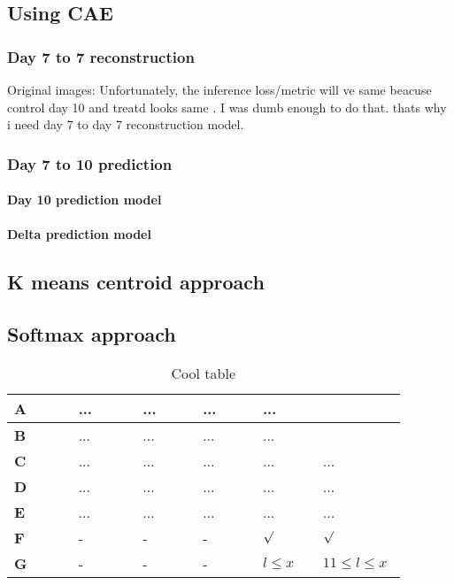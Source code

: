 \subsection{Using CAE} \label{subection:Using CAE}
\subsubsection{Day 7 to 7 reconstruction} \label{subsubection:Day 7 to 7 reconstruction}
Original images: Unfortunately, the inference loss/metric will ve same beacuse control day 10 and treatd looks same . I was dumb enough to do that. thats why i need  day 7 to day 7 reconstruction model.
\subsubsection{Day 7 to 10 prediction} \label{subsubection:Day 7 to 10 prediction}
\paragraph{Day 10 prediction model} \label{paragraph:Day 10 prediction model}
\paragraph{Delta prediction model} \label{paragraph:delta prediction}
\subsection{K means centroid approach} \label{subsection:kmeanscentroidapproach}
\subsection{Softmax approach} \label{subsection:kmeanscentroid}




\lipsum[3]
\begin{table}[H]
	\begin{center}
		\def\arraystretch{2}
		\begin{tabular}{p{0.155\linewidth}|p{0.15\linewidth}|p{0.145\linewidth}|p{0.14\linewidth}|p{0.14\linewidth}|p{0.15\linewidth}}
			\textbf{A}& ...	&...	&... &...  \\
			\hline \textbf{B} &...&...&... &... \\
			\hline \textbf{C} & ... &... &... &... &... \\
			\hline \textbf{D} & ... &...&... &... &... \\
			\hline \textbf{E} & ... &... &... &... &... \\
			\hline \textbf{F} & - &- &- &$\surd$  &$\surd$  \\
			\hline \textbf{G} & - & -& - & $l \leq x$ & $11 \leq l \leq x$\\
		\end{tabular}
	\end{center}
	\caption{Cool table}
	\label{tab:cool_table}
\end{table}